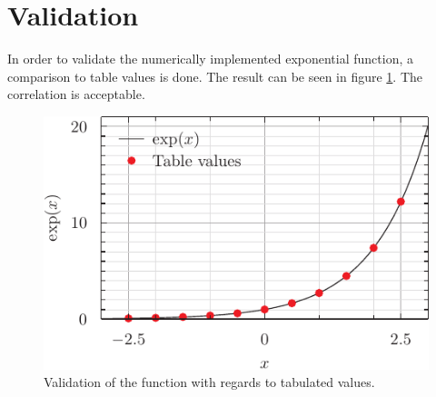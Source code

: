 \documentclass[11pt, twocolumn]{article}
\begin{document}
\section{Validation}
In order to validate the numerically implemented exponential function, a comparison to table values is done. The result can be seen in figure \ref{fig:validation}. The correlation is acceptable.
\begin{figure}
\includegraphics{exp_pyxplot.pdf}
\caption{Validation of the function with regards to tabulated values.}
\label{fig:validation}
\end{figure}
\end{document}
